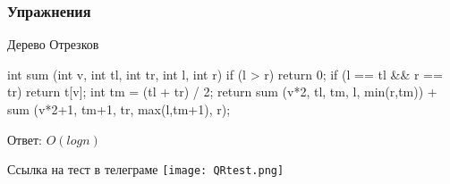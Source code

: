 
\begin{frame}[fragile]
    \frametitle{Упражнения}

    Дерево Отрезков
    \begin{cpp}
        int sum (int v, int tl, int tr, int l, int r) {
            if (l > r){
                return 0;
            }
            if (l == tl && r == tr){
                return t[v];
            }
            int tm = (tl + tr) / 2;
            return sum (v*2, tl, tm, l, min(r,tm))
            + sum (v*2+1, tm+1, tr, max(l,tm+1), r);
        }
    \end{cpp}
    
    Ответ: $O(log{n})$
\end{frame}


\begin{frame}
    \center\huge{Ссылка на тест в телеграме}
    \center\texttt{[image: QRtest.png]}
\end{frame}

